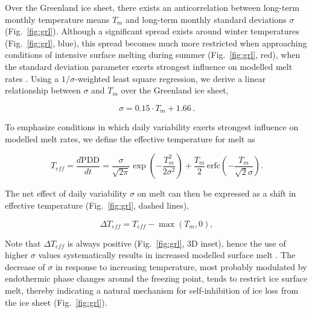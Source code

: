 \documentclass[review]{igs}
\begin{document}
Over the Greenland ice sheet, there exists an anticorrelation between long-term monthly temperature means $T_{m}$ and long-term monthly standard deviations $\sigma$ (Fig.~\ref{fig:grl}). Although a significant spread exists around winter temperatures (Fig.~\ref{fig:grl}, blue), this spread becomes much more restricted when approaching conditions of intensive surface melting during summer (Fig.~\ref{fig:grl}, red), when the standard deviation parameter exerts strongest influence on modelled melt rates \citep{rogozhina-rau-2014}. Using a $1/\sigma$-weighted least square regression, we derive a linear relationship between $\sigma$ and $T_{m}$ over the Greenland ice sheet,

\begin{equation} \label{eq:sigma}
    \sigma = 0.15 \cdot T_{m} + 1.66\,.
\end{equation}

To emphasize conditions in which daily variability exerts strongest influence on modelled melt rates, we define the effective temperature for melt as

\begin{equation} \label{eq:teff}
    T_{eff} = \frac{d\mathrm{PDD}}{dt}
        = \frac{\sigma}{\sqrt{2\pi}} \exp\left({-\frac{T_{m}^2}{2\sigma^2}}\right)
            + \frac{T_{m}}{2} \, \mathrm{erfc} \left(-\frac{T_{m}}{\sqrt{2}\sigma}\right).
\end{equation}

The net effect of daily variability $\sigma$ on melt can then be expressed as a shift in effective temperature (Fig.~\ref{fig:grl}, dashed lines),

\begin{equation} \label{eq:dteff}
    \Delta T_{eff} = T_{eff} - \max(T_{m}, 0),
\end{equation}

Note that $\Delta T_{eff}$ is always positive (Fig.~\ref{fig:grl}, 3D inset), hence the use of higher $\sigma$ values systematically results in increased modelled surface melt \citep{rogozhina-rau-2014}. The decrease of $\sigma$ in response to increasing temperature, most probably modulated by endothermic phase changes around the freezing point, tends to restrict ice surface melt, thereby indicating a natural mechanism for self-inhibition of ice loss from the ice sheet (Fig.~\ref{fig:grl}).
\end{document}
